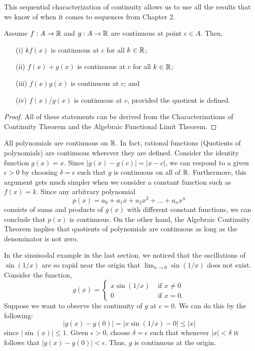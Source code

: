 This sequential characterization of continuity allows us to use all the results that we know of when it comes to sequences from Chapter 2. 


\begin{theorem}
    Assume \( f: A \to \mathbb{R}  \) and \( g: A \to \mathbb{R}  \) are continuous at point \( c \in A  \). Then, 
    \begin{enumerate}
        \item[(i)] \( kf(x)  \) is continuous at \( c  \) for all \( k \in \mathbb{R}  \);
        \item[(ii)] \( f(x) + g(x) \) is continuous at \( c  \) for all \( k \in \mathbb{R}  \);
        \item[(iii)] \( f(x) g(x) \) is continuous at \( c  \); and 
        \item[(iv)] \( f(x) / g(x)  \) is continuous at \( c  \), provided the quotient is defined.
    \end{enumerate}
    \end{theorem}

\begin{proof}
All of these statements can be derived from the Characterizations of Continuity Theorem and the Algebraic Functional Limit Theorem.
\end{proof}


All polynomials are continuous on \( \mathbb{R}  \). In fact, rational functions (Quotients of polynomials) are continuous wherever they are defined. Consider the identity function \( g(x) = x  \). Since \( | g(x) - g(c) | = | x - c  |  \), we can respond to a given \( \epsilon > 0 \) by choosing \( \delta = \epsilon  \) such that \( g  \) is continuous on all of \( \mathbb{R}  \). Furthermore, this argument gets much simpler when we consider a constant function such as \( f(x) = k  \). Since any arbitrary polynomial 
\[  p(x) = a_0 + a_1 x + a_2 x^2 + \dots + a_n x^n \]
consists of sums and products of \( g(x) \) with different constant functions, we can conclude that \( p(x) \) is continuous. On the other hand, the Algebraic Continuity Theorem implies that quotients of polynomials are continuous as long as the denominator is not zero.

In the sinuisodal example in the last section, we noticed that the oscillations of \( \sin (1/x ) \) are so rapid near the origin that \( \lim_{ x \to 0  } \sin (1/x) \) does not exist. Consider the function, 
\[  g(x) = 
\begin{cases}
    x \sin (1/x) &\text{~if~} x \neq 0 \\ 
    0 &\text{~if~}  x = 0. 
\end{cases} \]
Suppose we want to observe the continuity of \( g \) at \( c = 0  \). We can do this by the following:
\[ | g(x) - g(0) | = | x \sin(1/x) - 0  | \leq | x |   \]
since \( | \sin (x)  |  \leq 1 \). Given \( \epsilon > 0 \), choose \( \delta = \epsilon  \) such that whenever \( | x | < \delta \) it follows that \( | g(x) - g(0) | < \epsilon  \). Thus, \( g  \) is continuous at the origin. 



